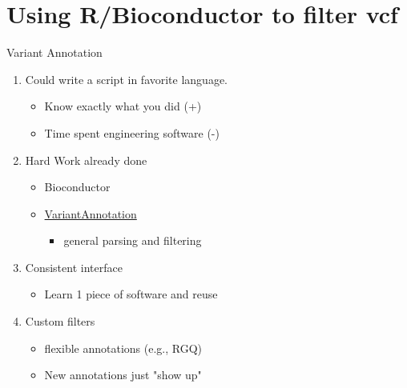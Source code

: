 \documentclass[t,10pt]{beamer}
\begin{document}
\section{Using R/Bioconductor to filter vcf}
\label{sec:orgheadline19}
\begin{frame}[label={sec:orgheadline18}]{Variant Annotation}
\begin{enumerate}[<+->]
\item Could write a script in favorite language. 
\begin{itemize}
\item Know exactly what you did (+)
\item Time spent engineering software (-)
\end{itemize}
\item Hard Work already done
\begin{itemize}
\item Bioconductor
\item \href{https://bioconductor.org/packages/release/bioc/html/VariantAnnotation.html}{VariantAnnotation} 
\begin{itemize}
\item general parsing and filtering
\end{itemize}
\end{itemize}
\item Consistent interface
\begin{itemize}
\item Learn 1 piece of software and reuse
\end{itemize}
\item Custom filters
\begin{itemize}
\item flexible annotations (e.g., RGQ)
\item New annotations just "\alert{show up}"
\end{itemize}
\end{enumerate}
\end{frame}
\end{document}
